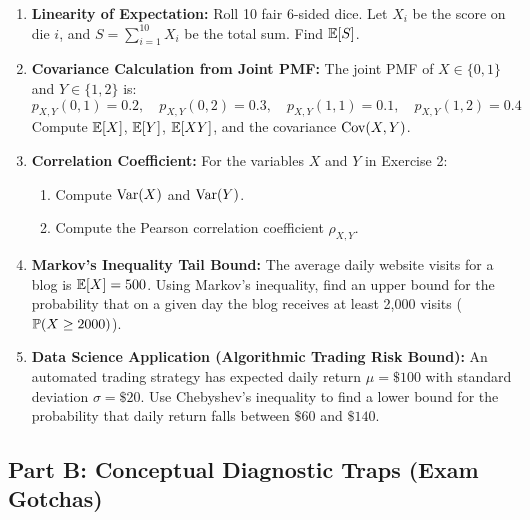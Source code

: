 \begin{enumerate}
\item \textbf{Linearity of Expectation:} Roll 10 fair 6-sided dice. Let $X_i$ be the score on die $i$, and $S = \sum_{i=1}^{10} X_i$ be the total sum. Find $\E[S]$.

\item \textbf{Covariance Calculation from Joint PMF:} The joint PMF of $X \in \{0, 1\}$ and $Y \in \{1, 2\}$ is:
    $$p_{X,Y}(0,1) = 0.2, \quad p_{X,Y}(0,2) = 0.3, \quad p_{X,Y}(1,1) = 0.1, \quad p_{X,Y}(1,2) = 0.4$$
    Compute $\E[X]$, $\E[Y]$, $\E[XY]$, and the covariance $\Cov(X, Y)$.

\item \textbf{Correlation Coefficient:} For the variables $X$ and $Y$ in Exercise 2:
    \begin{enumerate}
        \item Compute $\Var(X)$ and $\Var(Y)$.
        \item Compute the Pearson correlation coefficient $\rho_{X,Y}$.
    \end{enumerate}

\item \textbf{Markov's Inequality Tail Bound:} The average daily website visits for a blog is $\E[X] = 500$. Using Markov's inequality, find an upper bound for the probability that on a given day the blog receives at least 2,000 visits ($\P(X \ge 2000)$).

\item \textbf{Data Science Application (Algorithmic Trading Risk Bound):} An automated trading strategy has expected daily return $\mu = \$100$ with standard deviation $\sigma = \$20$. Use Chebyshev's inequality to find a lower bound for the probability that daily return falls between $\$60$ and $\$140$.
\end{enumerate}

\subsection*{Part B: Conceptual Diagnostic Traps (Exam Gotchas)}

